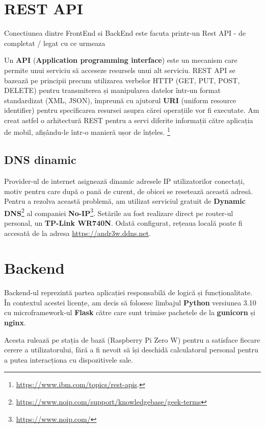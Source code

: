 \section{REST API}
Conectiunea dintre FrontEnd si BackEnd este facuta printr-un Rest API - de completat / legat cu ce urmeaza

Un \textbf{API} (\textbf{Application programming interface}) este un mecanism care permite unui serviciu să acceseze resursels unui alt serviciu. REST API se bazează pe principii precum utilizarea verbelor HTTP (GET, PUT, POST, DELETE) pentru transmiterea și manipularea datelor într-un format standardizat (XML, JSON), împreună cu ajutorul \textbf{URI} (uniform resource identifier) pentru specificarea resursei asupra cărei operațiile vor fi executate. Am creat astfel o arhitectură REST pentru a servi diferite informații către aplicația de mobil, afișându-le într-o manieră ușor de înțeles. \footnote{\url{https://www.ibm.com/topics/rest-apis}.}

\subsection{DNS dinamic}

Provider-ul de internet asignează dinamic adresele IP utilizatorilor conectați, motiv pentru care după o pană de curent, de obicei se resetează această adresă. Pentru a rezolva această problemă, am utilizat serviciul gratuit de \textbf{Dynamic DNS}\footnote{\url{https://www.noip.com/support/knowledgebase/geek-terms}} al companiei \textbf{No-IP}\footnote{\url{https://www.noip.com/}}. Setările au fost realizare direct pe router-ul personal, un \textbf{TP-Link WR740N}. Odată configurat, rețeaua locală poate fi accesată de la adresa \url{https://andr3w.ddns.net}.

\section{Backend}

Backend-ul reprezintă partea aplicației responsabilă de logică și funcționalitate. În contextul acestei licențe, am decis să folosesc limbajul \textbf{Python} versiunea 3.10 cu microframework-ul \textbf{Flask} către care sunt trimise pachetele de la \textbf{gunicorn} și \textbf{nginx}.

Acesta rulează pe stația de bază (Raspberry Pi Zero W) pentru a satisface fiecare cerere a utilizatorului, fără a fi nevoit să își deschidă calculatorul personal pentru a putea interacționa cu dispozitivele sale. 

